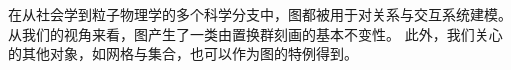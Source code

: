 

%     



在从社会学到粒子物理学的多个科学分支中，图都被用于对关系与交互系统建模。从我们的视角来看，图产生了一类由置换群刻画的基本不变性。
此外，我们关心的其他对象，如网格与集合，也可以作为图的特例得到。
%


